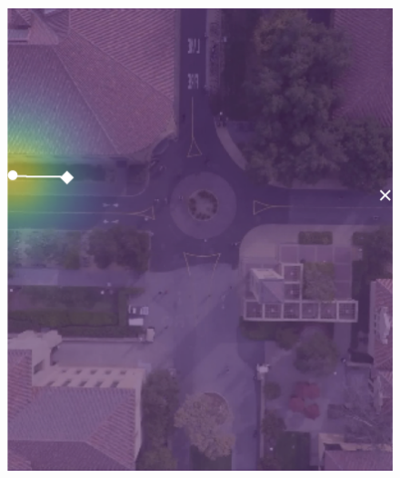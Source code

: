 \documentclass[letterpaper,10pt,conference]{ieeeconf}
\begin{document}
\begin{figure}
	\vspace{0.5cm}
	\begin{minipage}[t]{0.5cm}
	\end{minipage}
	\begin{minipage}[t]{0.3\linewidth}
		\includegraphics[width=\linewidth]{./figures/comparison/rand_death_1_2_t=70.png}
	\end{minipage}
	\begin{minipage}[t]{0.3\linewidth}

\end{minipage}
\end{figure}
\end{document}
